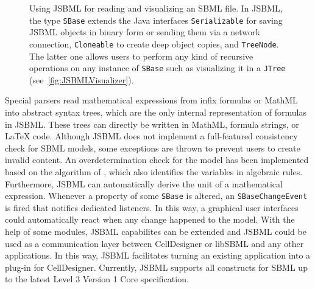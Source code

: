 \documentclass{bioinfo}
\begin{document}
\begin{methods}
\begin{figure}
{{{{\begin{minipage}[t][5.7cm][c]{.55\textwidth}
        \end{minipage}
      }
    }
  }\hspace{1cm}
}
\caption[Using JSBML for reading and visualizing an SBML file using
JSBML]{Using JSBML for reading and visualizing an SBML file. In JSBML, the type
\texttt{SBase} extends the Java interfaces \texttt{Serializable} for saving
JSBML objects in binary form or sending them via a network connection,
\texttt{Cloneable} to create deep object copies, and \texttt{TreeNode}. The
latter one allows users to perform any kind of recursive operations on any
instance of \texttt{SBase} such as visualizing it in a \texttt{JTree}
(see~\ref{fig:JSBMLVisualizer}).}
\label{fig:JSBML}
\end{figure}
Special parsers read mathematical expressions from infix formulas or MathML
into abstract syntax trees, which are the only internal representation
of formulas in JSBML.
These trees can directly be written in MathML, formula strings, or \LaTeX{}
code.
Although JSBML does not implement a full-featured
consistency check for SBML models, some exceptions are thrown to prevent users
to create invalid content. An overdetermination check for the model has been
implemented based on the algorithm of \citet{Hopcroft1973}, which also
identifies the variables in algebraic rules. Furthermore, JSBML can
automatically derive the unit of a mathematical expression.
Whenever a property of some \texttt{SBase} is altered, an
\texttt{SBaseChangeEvent} is fired that notifies dedicated listeners. In this
way, a graphical user interfaces could automatically react when any change
happened to the model. With the help of some modules, JSBML capabilites can be
extended and JSBML could be used as a communication layer between CellDesigner
\citep{Funahashi2003} or libSBML and any other applications. In this way, JSBML
facilitates turning an existing application into a plug-in for CellDesigner.
Currently, JSBML supports all constructs for SBML up to the latest Level 3
Version 1 Core specification.
\end{methods}
\end{document}
